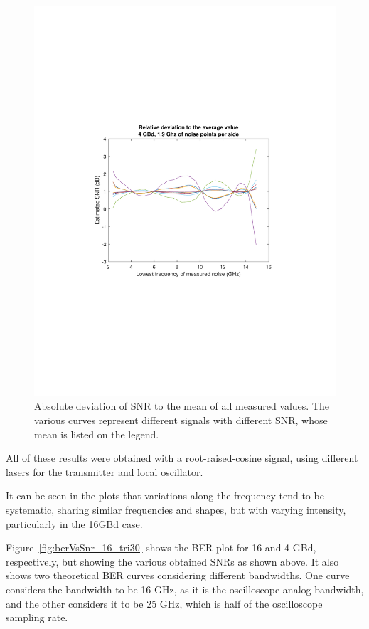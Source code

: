 \begin{refsection}
\begin{figure}[H]
\begin{minipage}{0.43\textwidth}
		\includegraphics[clip, trim=4cm 8cm 4cm 8cm, 
		width=1\textwidth]{./sdf/m_qam_system/figures/snr/relDev/4GBSNRRelDev.pdf}
		\subcaption{\label{fig:snrAbsRel_4_2500}}
	\end{minipage}
	\caption{Absolute deviation of SNR to the mean of all measured values. The 
	various curves represent different signals with different SNR, whose mean 
	is listed on the legend.\label{fig:RelDev_16_tri30}}
\end{figure}


All of these results were obtained with a root-raised-cosine signal, using 
different lasers for the transmitter and local oscillator.

It can be seen in the plots that variations along the frequency tend to be 
systematic, sharing similar frequencies and shapes, but with varying intensity, 
particularly in the 16GBd case.

Figure~\ref{fig:berVsSnr_16_tri30} shows the BER plot for 16 and 4 GBd, 
respectively, but showing the various obtained SNRs as shown above. It also 
shows two theoretical BER curves considering different bandwidths. One curve 
considers the bandwidth to be 16 GHz, as it is the oscilloscope analog 
bandwidth, and the other considers it to be 25 GHz, which is half of the 
oscilloscope sampling rate. 


\end{refsection}

